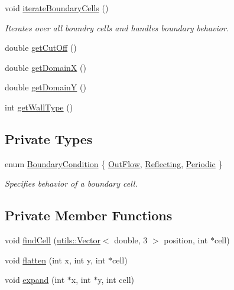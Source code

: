 \begin{DoxyCompactItemize}
\item 
void \hyperlink{classSimulation_1_1ParticleContainer_a4ecf8c0f85e656bbfbe36b883c5e5e23}{iterate\-Boundary\-Cells} ()
\begin{DoxyCompactList}\small\item\em Iterates over all boundry cells and handles boundary behavior. \end{DoxyCompactList}\item 
double \hyperlink{classSimulation_1_1ParticleContainer_a81e96b1c9c1466650af5c5a0b2fb5652}{get\-Cut\-Off} ()
\item 
double \hyperlink{classSimulation_1_1ParticleContainer_aca55beff40f1a87aff98df78449fa07d}{get\-Domain\-X} ()
\item 
double \hyperlink{classSimulation_1_1ParticleContainer_a81219d7633c7ed8d4c3efaa37f15de8b}{get\-Domain\-Y} ()
\item 
int \hyperlink{classSimulation_1_1ParticleContainer_ad313d33feb003443885f79cb370f274e}{get\-Wall\-Type} ()
\end{DoxyCompactItemize}
\subsection*{Private Types}
\begin{DoxyCompactItemize}
\item 
enum \hyperlink{classSimulation_1_1ParticleContainer_a5e913177d570f1276e90e4d5c19029bd}{Boundary\-Condition} \{ \hyperlink{classSimulation_1_1ParticleContainer_a5e913177d570f1276e90e4d5c19029bda02c8f7e918ce61d7457aad6d5136de06}{Out\-Flow}, 
\hyperlink{classSimulation_1_1ParticleContainer_a5e913177d570f1276e90e4d5c19029bda38294f9ed6bccc27cb21a49dfd465383}{Reflecting}, 
\hyperlink{classSimulation_1_1ParticleContainer_a5e913177d570f1276e90e4d5c19029bda98c413bdf3bd391fb5e5cb15a13a1b7a}{Periodic}
 \}
\begin{DoxyCompactList}\small\item\em Specifies behavior of a boundary cell. \end{DoxyCompactList}\end{DoxyCompactItemize}
\subsection*{Private Member Functions}
\begin{DoxyCompactItemize}
\item 
void \hyperlink{classSimulation_1_1ParticleContainer_aafaf96d8f9cf6ee877b0e001f46e854a}{find\-Cell} (\hyperlink{classutils_1_1Vector}{utils\-::\-Vector}$<$ double, 3 $>$ position, int $\ast$cell)
\item 
void \hyperlink{classSimulation_1_1ParticleContainer_aa815ad7b798de3be1f1c35f1e979716d}{flatten} (int x, int y, int $\ast$cell)
\item 
void \hyperlink{classSimulation_1_1ParticleContainer_a3d88bfbe1dcd2857d9ca60e87e112090}{expand} (int $\ast$x, int $\ast$y, int cell)
\end{DoxyCompactItemize}
